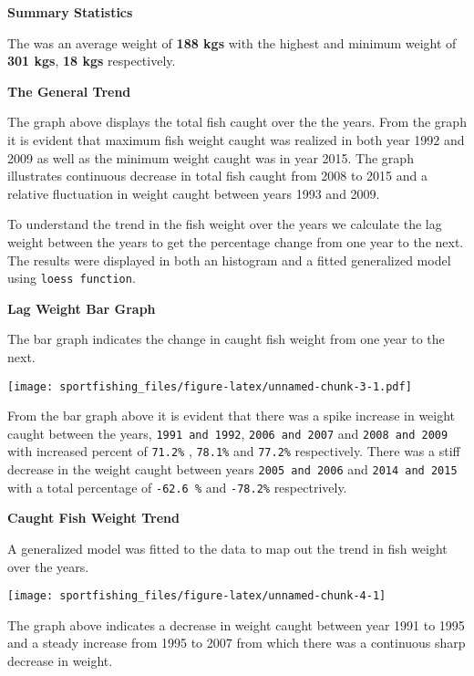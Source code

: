 \documentclass[
]{article}
\begin{document}
\textbf{Summary Statistics}

The was an average weight of \textbf{188 kgs} with the highest and
minimum weight of \textbf{301 kgs}, \textbf{18 kgs} respectively.

\textbf{The General Trend}

The graph above displays the total fish caught over the the years. From
the graph it is evident that maximum fish weight caught was realized in
both year 1992 and 2009 as well as the minimum weight caught was in year
2015. The graph illustrates continuous decrease in total fish caught
from 2008 to 2015 and a relative fluctuation in weight caught between
years 1993 and 2009.

To understand the trend in the fish weight over the years we calculate
the lag weight between the years to get the percentage change from one
year to the next. The results were displayed in both an histogram and a
fitted generalized model using \texttt{loess\ function}.

\newpage

\textbf{Lag Weight Bar Graph }

The bar graph indicates the change in caught fish weight from one year
to the next.

\texttt{[image: sportfishing\_files/figure-latex/unnamed-chunk-3-1.pdf]}

From the bar graph above it is evident that there was a spike increase
in weight caught between the years, \texttt{1991\ and\ 1992},
\texttt{2006\ and\ 2007} and \texttt{2008\ and\ 2009} with increased
percent of \texttt{71.2\%} , \texttt{78.1\%} and \texttt{77.2\%}
respectively. There was a stiff decrease in the weight caught between
years \texttt{2005\ and\ 2006} and \texttt{2014\ and\ 2015} with a total
percentage of \texttt{-62.6\ \%} and \texttt{-78.2\%} respectrively.

\newpage

\textbf{Caught Fish Weight Trend}

A generalized model was fitted to the data to map out the trend in fish
weight over the years.

\begin{center}\texttt{[image: sportfishing\_files/figure-latex/unnamed-chunk-4-1]} \end{center}

The graph above indicates a decrease in weight caught between year 1991
to 1995 and a steady increase from 1995 to 2007 from which there was a
continuous sharp decrease in weight.
\end{document}
